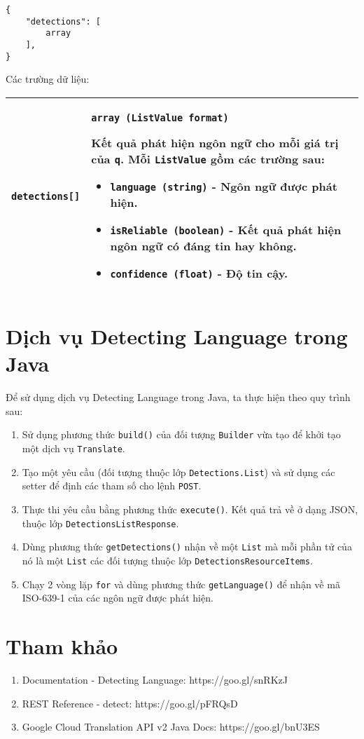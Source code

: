\documentclass[../thesis.tex]{subfiles}
\begin{document}
\begin{lstlisting}[style=link]
{
	"detections": [
		array
	],
}
\end{lstlisting}

Các trường dữ liệu:
\begin{center}
\begin{tabularx}{\textwidth}{|p{}|X|}
\hline
\lstinline{detections[]} & \lstinline{array (ListValue format)}

Kết quả phát hiện ngôn ngữ cho mỗi giá trị của \lstinline{q}. Mỗi \lstinline{ListValue} gồm các trường sau:

\begin{itemize}
  \item \lstinline{language (string)} - Ngôn ngữ được phát hiện.
  \item \lstinline{isReliable (boolean)} - Kết quả phát hiện ngôn ngữ có đáng tin hay không.
  \item \lstinline{confidence (float)} - Độ tin cậy.
\end{itemize}
\\
\hline
\end{tabularx}
\end{center}

\section{Dịch vụ Detecting Language trong Java}
Để sử dụng dịch vụ Detecting Language trong Java, ta thực hiện theo quy trình sau:
\begin{enumerate}
  \item Sử dụng phương thức \lstinline{build()} của đối tượng \lstinline{Builder} vừa tạo để khởi tạo một dịch vụ \lstinline{Translate}.
  \item Tạo một yêu cầu (đối tượng thuộc lớp \lstinline{Detections.List}) và sử dụng các setter để định các tham số cho lệnh \lstinline{POST}.
  \item Thực thi yêu cầu bằng phương thức \lstinline{execute()}. Kết quả trả về ở dạng JSON, thuộc lớp \lstinline{DetectionsListResponse}.
  \item Dùng phương thức \lstinline{getDetections()} nhận về một \lstinline{List} mà mỗi phần tử của nó là một \lstinline{List} các đối tượng thuộc lớp \lstinline{DetectionsResourceItems}.
  \item Chạy 2 vòng lặp \lstinline{for} và dùng phương thức \lstinline{getLanguage()} để nhận về mã ISO-639-1 của các ngôn ngữ được phát hiện.
\end{enumerate}

\section*{Tham khảo}

\begin{enumerate}
  \item Documentation - Detecting Language: https://goo.gl/snRKzJ
  \item REST Reference - detect: https://goo.gl/pFRQsD
  \item Google Cloud Translation API v2 Java Docs: https://goo.gl/bnU3ES
\end{enumerate}
\end{document}
